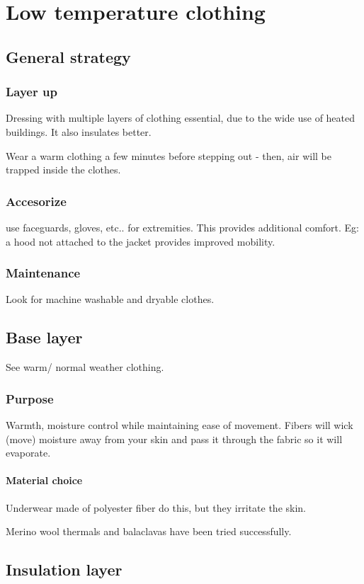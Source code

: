 \documentclass[oneside, article]{memoir}
\begin{document}
\chapter{Low temperature clothing}
\section{General strategy}
\subsection{Layer up}
Dressing with multiple layers of clothing essential, due to the wide use of heated buildings. It also insulates better.

Wear a warm clothing a few minutes before stepping out - then, air will be trapped inside the clothes.

\subsection{Accesorize}
use faceguards, gloves, etc.. for extremities. This provides additional comfort. Eg: a hood not attached to the jacket provides improved mobility.

\subsection{Maintenance}
Look for machine washable and dryable clothes.

\section{Base layer}
See warm/ normal weather clothing.

\subsection{Purpose}
Warmth, moisture control while maintaining ease of movement.
Fibers will wick (move) moisture away from your skin and pass it through the fabric so it will evaporate.

\subsubsection{Material choice}
Underwear made of polyester fiber do this, but they irritate the skin.

Merino wool thermals and balaclavas have been tried successfully.

\section{Insulation layer}
\end{document}

